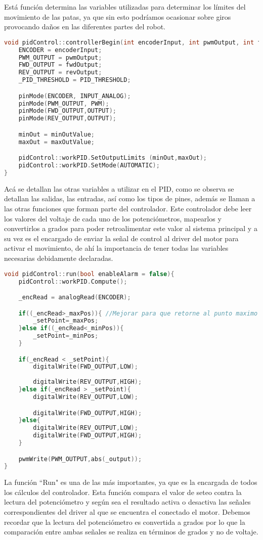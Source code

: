 \documentclass[12pt,letterpaper]{IEEEtran}
\begin{document}
Está función determina las variables utilizadas para determinar los límites del movimiento de las patas, ya que sin esto podríamos ocasionar sobre giros provocando daños en las diferentes partes del robot.\\

\begin{lstlisting}[language=c++]
void pidControl::controllerBegin(int encoderInput, int pwmOutput, int fwdOutput, int revOutput, double minOutValue, double maxOutValue, double PID_THRESHOLD=15000){
	ENCODER = encoderInput;
	PWM_OUTPUT = pwmOutput;
	FWD_OUTPUT = fwdOutput;
	REV_OUTPUT = revOutput;
	_PID_THRESHOLD = PID_THRESHOLD; 

	pinMode(ENCODER, INPUT_ANALOG);
	pinMode(PWM_OUTPUT, PWM);
	pinMode(FWD_OUTPUT,OUTPUT);
	pinMode(REV_OUTPUT,OUTPUT);

	minOut = minOutValue;
	maxOut = maxOutValue;

	pidControl::workPID.SetOutputLimits (minOut,maxOut);
	pidControl::workPID.SetMode(AUTOMATIC);
}
\end{lstlisting}

Acá se detallan las otras variables a utilizar en el PID, como se observa se detallan las salidas, las entradas, así como los tipos de pines, además se llaman a las otras funciones que forman parte del controlador. 
Este controlador debe leer los valores del voltaje de cada uno de los potenciómetros, mapearlos y convertirlos a grados para poder retroalimentar este valor al sistema principal y a su vez es el encargado de enviar la señal de control al driver del motor para activar el movimiento, de ahí la importancia de tener todas las variables necesarias debidamente declaradas.\\

\begin{lstlisting}[language=c++]
void pidControl::run(bool enableAlarm = false){
	pidControl::workPID.Compute();

	_encRead = analogRead(ENCODER);

	if((_encRead>_maxPos)){ //Mejorar para que retorne al punto maximo
		_setPoint=_maxPos;
	}else if((_encRead<_minPos)){
		_setPoint=_minPos;
	}

	if(_encRead < _setPoint){
		digitalWrite(FWD_OUTPUT,LOW);
	
		digitalWrite(REV_OUTPUT,HIGH);
	}else if(_encRead > _setPoint){
		digitalWrite(REV_OUTPUT,LOW);

		digitalWrite(FWD_OUTPUT,HIGH);
	}else{
		digitalWrite(REV_OUTPUT,LOW);
		digitalWrite(FWD_OUTPUT,HIGH);
	}

	pwmWrite(PWM_OUTPUT,abs(_output));
}
\end{lstlisting}
La función ``Run" es una de las más importantes, ya que es la encargada de todos los cálculos del controlador. Esta función compara el valor de seteo contra la lectura del potenciómetro y según sea el resultado activa o desactiva las señales correspondientes del driver al que se encuentra el conectado el motor.
Debemos recordar que la lectura del potenciómetro es convertida a grados por lo que la comparación entre ambas señales se realiza en términos de grados y no de voltaje.
\end{document}
